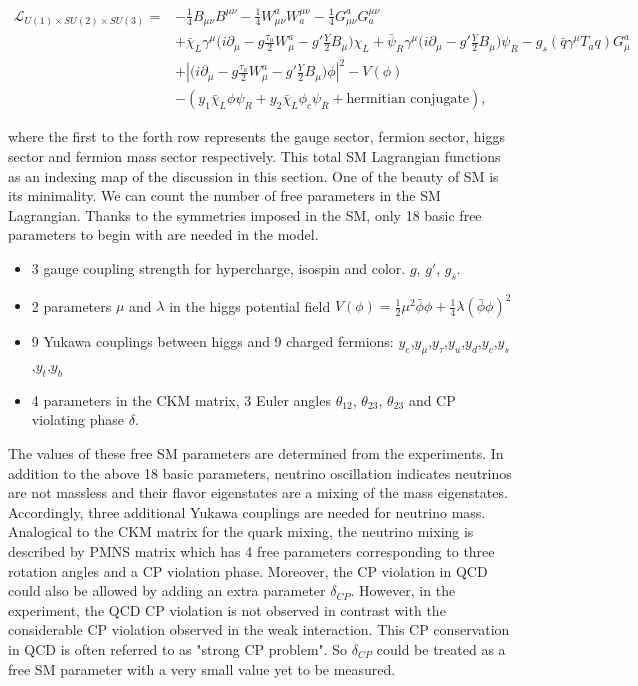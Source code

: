 \begin{equation}
\begin{split}
    \mathcal{L}_{U(1)\times SU(2) \times SU(3)} =&   - \frac{1}{4}B_{\mu\nu}B^{\mu\nu} - \frac{1}{4}W^a_{\mu\nu}W^{\mu\nu}_a - \frac{1}{4}G^a_{\mu\nu}G^{\mu\nu}_a\\
    & + \bar{\chi}_L \gamma^\mu \big( i \partial_\mu -g \frac{\tau_a}{2} W^a_\mu -g'\frac{Y}{2} B_\mu \big) \chi_L 
    + \bar{\psi}_R \gamma^\mu \big( i \partial_\mu -g'\frac{Y}{2} B_\mu \big) \psi_R 
    - g_s (\bar{q}\gamma^\mu  T_{a} q) G_\mu^a \\
    & + \left\lvert  \big( i \partial_\mu -g \frac{\tau_a}{2} W^a_\mu -g'\frac{Y}{2} B_\mu \big)\phi \right\rvert ^2 - V(\phi) \\
    & -(y_1 \bar{\chi}_L \phi \psi_R + y_2 \bar{\chi}_L \phi_c \psi_R + \text{hermitian conjugate}),
\end{split}
\label{eqn:physics:qft:smLagrangian} 
\end{equation}

\noindent where the first to the forth row represents the gauge sector, fermion sector, higgs sector and fermion mass sector respectively. This total SM Lagrangian functions as an indexing map of the discussion in this section. One of the beauty of SM is its minimality. We can count the number of free parameters in the SM Lagrangian. Thanks to the symmetries imposed in the SM, only 18 basic free parameters to begin with are needed in the model.
\begin{itemize}
    \item 3 gauge coupling strength for hypercharge, isospin and color. $g$, $g'$, $g_s$.
    \item 2 parameters $\mu$ and $\lambda$ in the higgs potential field $V(\phi)=\frac{1}{2} \mu^2 \bar{\phi}\phi + \frac{1}{4} \lambda(\bar{\phi}\phi )^2 $
    \item 9 Yukawa couplings between higgs and 9 charged fermions: $y_e$,$y_\mu$,$y_\tau$,$y_u$,$y_d$,$y_c$,$y_s$,$y_t$,$y_b$
    \item 4 parameters in the CKM matrix, 3 Euler angles $\theta_{12}$, $\theta_{23}$, $\theta_{23}$ and CP violating phase $\delta$.
\end{itemize}

The values of these free SM parameters are determined from the experiments. In addition to the above 18 basic parameters, neutrino oscillation indicates neutrinos are not massless and their flavor eigenstates are a mixing of the mass eigenstates. Accordingly, three additional Yukawa couplings are needed for neutrino mass. Analogical to the CKM matrix for the quark mixing, the neutrino mixing is described by PMNS matrix which has 4 free parameters corresponding to three rotation angles and a CP violation phase. Moreover, the CP violation in QCD could also be allowed by adding an extra parameter $\delta_{CP}$. However, in the experiment, the QCD CP violation is not observed in contrast with the considerable CP violation observed in the weak interaction. This CP conservation in QCD is often referred to as "strong CP problem". So $\delta_{CP}$ could be treated as a free SM parameter with a very small value yet to be measured.




